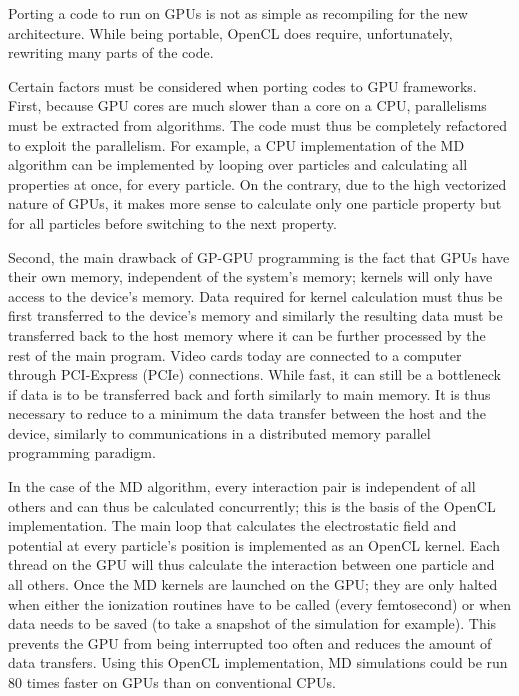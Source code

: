Porting a code to run on GPUs is not as simple as recompiling
for the new architecture. While being portable, OpenCL does require, unfortunately, rewriting
many parts of the code.



Certain factors must be considered when porting codes to GPU frameworks.
First, because GPU cores are much slower than a core on a CPU,
parallelisms must be extracted from algorithms. The code must thus be
completely refactored to exploit the parallelism. For example, a CPU
implementation of the MD algorithm can be implemented by looping over particles
and calculating all properties at once, for every particle. On the contrary,
due to the high vectorized nature of GPUs, it makes more sense to calculate
only one particle property but for all particles before switching to the next
property.

Second, the main drawback of
GP-GPU programming is the fact that GPUs have their own memory, independent of
the system's memory; kernels will only have access to the device's memory. Data
required for kernel calculation must thus be first transferred to the device's
memory and similarly the resulting data must be transferred back to the host
memory where it can be further processed by the rest of the main program. Video
cards today are connected to a computer through PCI-Express (PCIe) connections.
While fast, it can still be a bottleneck if data is to be transferred back and
forth similarly to main memory. It is thus necessary to reduce to a minimum the
data transfer between the host and the device, similarly to communications in a
distributed memory parallel programming paradigm.

In the case of the MD algorithm, every interaction pair is independent of all
others and can thus be calculated concurrently; this is the basis of the
OpenCL implementation. The main loop that calculates the electrostatic field
and potential at every particle's position is implemented as an OpenCL kernel.
Each thread on the GPU will thus calculate the interaction between one particle
and all others. Once the MD kernels are launched on the GPU; they are only
halted when either the ionization routines have to be called (every femtosecond) or
when data needs to be saved (to take a snapshot of the simulation for example).
This prevents the GPU from being interrupted too often and reduces the amount of
data transfers. Using this OpenCL implementation, MD simulations could be run
80 times faster on GPUs than on conventional CPUs.

